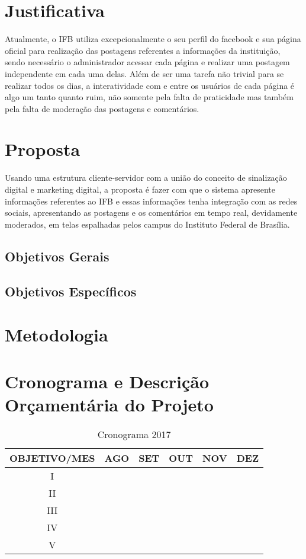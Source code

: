 \documentclass[
	12pt,				%
	openright,			%
	oneside,			%
	a4paper,			%
	english,			%
	french,				%
	spanish,			%
	brazil,				%
	]{abntex2}
\begin{document}
\section*{Justificativa}
	Atualmente, o IFB utiliza excepcionalmente o seu perfil do facebook e sua página oficial para realização das postagens referentes a informações da instituição, sendo necessário o administrador acessar cada página e realizar uma postagem independente em cada uma delas. Além de ser uma tarefa não trivial para se realizar todos os dias, a interatividade com e entre os usuários de cada página é algo um tanto quanto ruim, não somente pela falta de praticidade mas também pela falta de moderação das postagens e comentários.
	
\section*{Proposta}
	Usando uma estrutura cliente-servidor com a união do conceito de sinalização digital e marketing digital, a proposta é fazer com que o sistema apresente informações referentes ao IFB e essas informações tenha integração com as redes sociais, apresentando as postagens e os comentários em tempo real, devidamente moderados, em telas espalhadas pelos campus do Instituto Federal de Brasília.
	
\subsection*{Objetivos Gerais}
	

\subsection*{Objetivos Específicos}

\section*{Metodologia}

\section*{Cronograma e Descrição Orçamentária do Projeto}
	\begin{table}[h!]
		\centering
		\caption{Cronograma 2017}
		\label{my-label}
		\begin{tabular}{|c|c|c|c|c|c|}
			\hline
			OBJETIVO/MES & AGO & SET & OUT & NOV & DEZ \\ \hline
			I &  & & & & \\ \hline
			II &  & & & & \\ \hline
			III &  & & & & \\ \hline
			IV &  & & & & \\ \hline
			V &  & & & & \\ \hline
		\end{tabular}
	\end{table}
\end{document}
